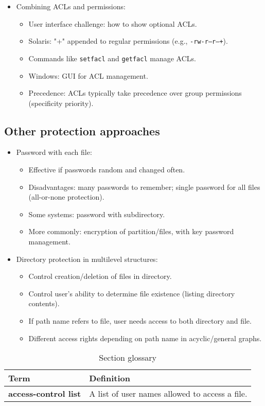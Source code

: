 \begin{itemize}
\begin{itemize}
    \end{itemize}
    \item Combining ACLs and permissions:
    \begin{itemize}
        \item User interface challenge: how to show optional ACLs.
        \item Solaris: "+" appended to regular permissions (e.g., \texttt{-rw-r--r--+}).
        \item Commands like \texttt{setfacl} and \texttt{getfacl} manage ACLs.
        \item Windows: GUI for ACL management.
        \item Precedence: ACLs typically take precedence over group permissions (specificity priority).
    \end{itemize}
\end{itemize}

\subsection{Other protection approaches}
\begin{itemize}
    \item Password with each file:
    \begin{itemize}
        \item Effective if passwords random and changed often.
        \item Disadvantages: many passwords to remember; single password for all files (all-or-none protection).
        \item Some systems: password with subdirectory.
        \item More commonly: encryption of partition/files, with key password management.
    \end{itemize}
    \item Directory protection in multilevel structures:
    \begin{itemize}
        \item Control creation/deletion of files in directory.
        \item Control user's ability to determine file existence (listing directory contents).
        \item If path name refers to file, user needs access to both directory and file.
        \item Different access rights depending on path name in acyclic/general graphs.
    \end{itemize}
\end{itemize}

\begin{table}[h!]
\centering
\caption{Section glossary}
\label{tab:section_glossary}
\begin{tabular}{p{}p{}}
\toprule
\rowcolor{gray!20} \textbf{Term} & \textbf{Definition} \\
\midrule
\textbf{access-control list} & A list of user names allowed to access a file. \\
\bottomrule
\end{tabular}
\end{table}
